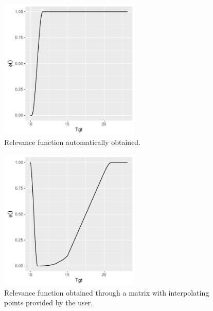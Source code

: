 \documentclass[10pt,a4paper]{article}\usepackage[]{graphicx}\usepackage[]{color}
\newenvironment{knitrout}{}{} %
\begin{document}
\begin{knitrout}\footnotesize
{}\color{fgcolor}\begin{figure}

{\centering \includegraphics[width=0.6\textwidth]{figures/UBL-Rel1-1} 

}

\caption[Relevance function automatically obtained]{Relevance function automatically obtained.}\label{fig:Rel1}
\end{figure}


\end{knitrout}


\begin{knitrout}\footnotesize
{}\color{fgcolor}\begin{figure}

{\centering \includegraphics[width=0.6\textwidth]{figures/UBL-Rel2-1} 

}

\caption[Relevance function obtained through a matrix with interpolating points provided by the user]{Relevance function obtained through a matrix with interpolating points provided by the user.}\label{fig:Rel2}
\end{figure}


\end{knitrout}
\end{document}
